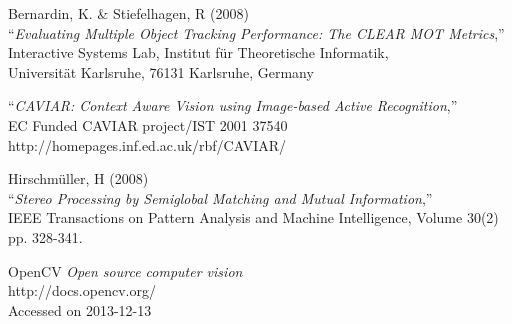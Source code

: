 \begin{thebibliography}{9}
	Bernardin, K. \& Stiefelhagen, R (2008)\\
	``\textit{Evaluating Multiple Object Tracking Performance: The CLEAR MOT Metrics},''\\
	Interactive Systems Lab, Institut für Theoretische Informatik,\\
	Universität Karlsruhe, 76131 Karlsruhe, Germany
	
	``\textit{CAVIAR: Context Aware Vision using Image-based Active Recognition},''\\
	EC Funded CAVIAR project/IST 2001 37540\\
	http://homepages.inf.ed.ac.uk/rbf/CAVIAR/
	
	Hirschmüller, H (2008)\\
	``\textit{Stereo Processing by Semiglobal Matching and Mutual Information},''\\
	IEEE Transactions on Pattern Analysis and Machine Intelligence, Volume 30(2)
	pp. 328-341.
	
	OpenCV \textit{Open source computer vision}\\
	http://docs.opencv.org/\\
	Accessed on 2013-12-13\\
	


\end{thebibliography}